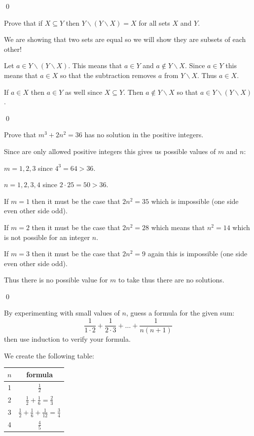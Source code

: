 \documentclass[addpoints]{exam}
\begin{document}
\begin{questions}
\begin{solution}
    \qed
  \end{solution}

  \question Prove that if $X\subseteq Y$ then $Y\backslash (Y\backslash X) = X$ for all sets $X$ and $Y$.

  \vspace*{\fill}
  \begin{solution}
    We are showing that two sets are equal so we will show they are subsets of each other!

    Let $a\in Y \backslash (Y\backslash X)$. This means that $a\in Y$ and $a\not\in Y\backslash X$. Since $a\in Y$ this means that $a\in X$ so that the subtraction removes $a$ from $Y\backslash X$. Thus $a\in X$.

    If $a\in X$ then $a\in Y$ as well since $X\subseteq Y$. Then $a\not \in Y\backslash X$ so that $a\in Y\backslash (Y\backslash X)$.

    \qed
  \end{solution}

  \question Prove that $m^3 + 2n^2 = 36$ has no solution in the positive integers.
  \vspace*{\fill}
  \begin{solution}
    Since are only allowed positive integers this gives us possible values of $m$ and $n$:

    $m = 1,2,3$ since $4^3 = 64 > 36$. 

    $n = 1,2,3,4$ since $2\cdot 25 = 50 > 36$.

    If $m = 1$ then it must be the case that $2n^2 = 35$ which is impossible (one side even other side odd).

    If $m = 2$ then it must be the case that $2n^2 = 28$ which means that $n^2 = 14$ which is not possible for an integer $n$.

    If $m = 3$ then it must be the case that $2n^2 = 9$ again this is impossible (one side even other side odd).

    Thus there is no possible value for $m$ to take thus there are no solutions.

    \qed
  \end{solution}

  \question By experimenting with small values of $n$, guess a formula for the given sum:
  \[
    \frac{1}{1\cdot 2} + \frac{1}{2\cdot 3} + \dots + \frac{1}{n(n+1)}
  \]
  then use induction to verify your formula.

  \vspace*{\fill}
  \begin{solution}
    We create the following table:
    \begin{tabular}{c|c}
      $n$ & formula\\
      \hline
      1 & $\frac{1}{2}$\\
      2 & $\frac{1}{2} + \frac{1}{6} = \frac{2}{3}$\\
      3 & $\frac{1}{2} + \frac{1}{6} + \frac{1}{12} = \frac{3}{4}$\\
      4 & $\frac{4}{5}$
    \end{tabular}


\end{solution}
\end{questions}
\end{document}
